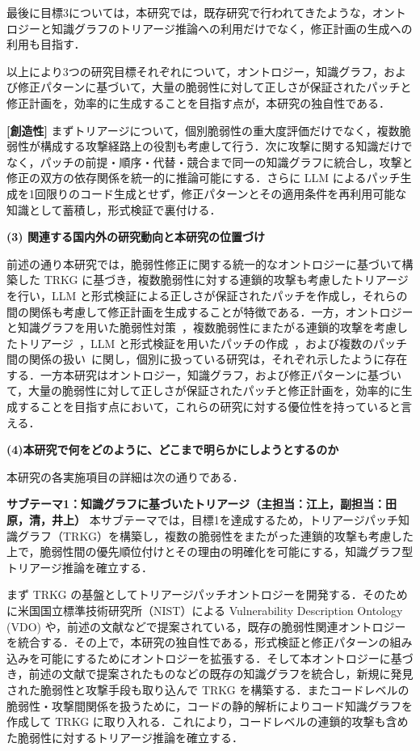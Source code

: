 \documentclass[11pt,a4j,dvipdfmx]{jarticle} 					%
\newcommand{\研究課題名}{大量の脆弱性・攻撃手段・パッチの依存関係を考慮した証明付き修正計画の自動生成}
\newcommand{\研究機関名}{電気通信大学}
\newcommand{\研究代表者氏名}{田原 康之}
\newcommand{\研究期間の最終元号年度}{12}  %
\begin{document}
最後に目標3については，本研究では，既存研究で行われてきたような，オントロジーと知識グラフのトリアージ推論への利用だけでなく，修正計画の生成への利用も目指す．

以上により3つの研究目標それぞれについて，オントロジー，知識グラフ，および修正パターンに基づいて，大量の脆弱性に対して正しさが保証されたパッチと修正計画を，効率的に生成することを目指す点が，本研究の独自性である．

\textbf{[創造性]} まずトリアージについて，個別脆弱性の重大度評価だけでなく，複数脆弱性が構成する攻撃経路上の役割も考慮して行う．次に攻撃に関する知識だけでなく，パッチの前提・順序・代替・競合まで同一の知識グラフに統合し，攻撃と修正の双方の依存関係を統一的に推論可能にする．さらに LLM によるパッチ生成を1回限りのコード生成とせず，修正パターンとその適用条件を再利用可能な知識として蓄積し，形式検証で裏付ける．
	
\noindent\textbf{(3) 関連する国内外の研究動向と本研究の位置づけ}

前述の通り本研究では，脆弱性修正に関する統一的なオントロジーに基づいて構築した TRKG に基づき，複数脆弱性に対する連鎖的攻撃も考慮したトリアージを行い，LLM と形式検証による正しさが保証されたパッチを作成し，それらの間の関係も考慮して修正計画を生成することが特徴である．一方，オントロジーと知識グラフを用いた脆弱性対策~\cite{10.1145/3803437.3805583,mukhtar2026vulreadknowledgegraphguidedsoftwarevulnerability}，複数脆弱性にまたがる連鎖的攻撃を考慮したトリアージ~\cite{10.1145/3803437.3805583,11097865}，LLM と形式検証を用いたパッチの作成~\cite{11081727}，および複数のパッチ間の関係の扱い~\cite{308048}に関し，個別に扱っている研究は，それぞれ示したように存在する．一方本研究はオントロジー，知識グラフ，および修正パターンに基づいて，大量の脆弱性に対して正しさが保証されたパッチと修正計画を，効率的に生成することを目指す点において，これらの研究に対する優位性を持っていると言える．

\noindent\textbf{(4)本研究で何をどのように、どこまで明らかにしようとするのか}

本研究の各実施項目の詳細は次の通りである．

\noindent\textbf{サブテーマ1：知識グラフに基づいたトリアージ（主担当：江上，副担当：田原，清，井上）} 本サブテーマでは，目標1を達成するため，トリアージパッチ知識グラフ（TRKG）を構築し，複数の脆弱性をまたがった連鎖的攻撃も考慮した上で，脆弱性間の優先順位付けとその理由の明確化を可能にする，知識グラフ型トリアージ推論を確立する．

まず TRKG の基盤としてトリアージパッチオントロジーを開発する．そのために米国国立標準技術研究所（NIST）による Vulnerability Description Ontology (VDO) や，前述の文献などで提案されている，既存の脆弱性関連オントロジーを統合する．その上で，本研究の独自性である，形式検証と修正パターンの組み込みを可能にするためにオントロジーを拡張する．そして本オントロジーに基づき，前述の文献で提案されたものなどの既存の知識グラフを統合し，新規に発見された脆弱性と攻撃手段も取り込んで TRKG を構築する．またコードレベルの脆弱性・攻撃間関係を扱うために，コードの静的解析によりコード知識グラフを作成して TRKG に取り入れる．これにより，コードレベルの連鎖的攻撃も含めた脆弱性に対するトリアージ推論を確立する．
\end{document}
